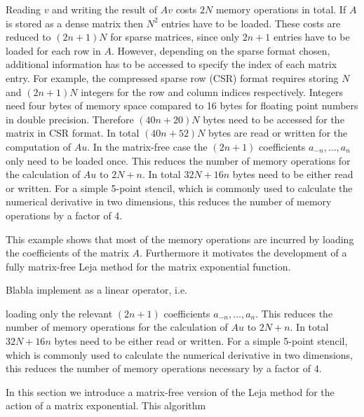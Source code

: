 \documentclass{scrartcl}
\begin{document}

Reading $v$ and writing the result of $Av$ costs $2N$ memory operations in total. If $A$ is stored as a dense matrix then $N^2$ entries have to be loaded. These costs are reduced to $(2n+1)N$ for sparse matrices, since only $2n+1$ entries have to be loaded for each row in $A$. However, depending on the sparse format chosen, additional information has to be accessed to specify the index of each matrix entry. For example, the compressed sparse row (CSR) format requires storing $N$ and $(2n+1)N$ integers for the row and column indices respectively. Integers need four bytes of memory space compared to 16 bytes for floating point numbers in double precision. Therefore $(40n + 20)N$ bytes need to be accessed for the matrix in CSR format. In total $(40n + 52)N$ bytes are read or written for the computation of $Au$.
In the matrix-free case the $(2n+1)$ coefficients $a_{-n}, \dots, a_{n}$ only need to be loaded once. This reduces the number of memory operations for the calculation of $Au$ to $2N + n$. In total $32N + 16n$ bytes need to be either read or written. For a simple 5-point stencil, which is commonly used to calculate the numerical derivative in two dimensions, this reduces the number of memory operations by a factor of 4.

This example shows that most of the memory operations are incurred by loading the coefficients of the matrix $A$. Furthermore it motivates the development of a fully matrix-free Leja method for the matrix exponential function. 

Blabla implement as a linear operator, i.e.

loading only the relevant $(2n+1)$ coefficients $a_{-n}, \dots, a_{n}$. This reduces the number of memory operations for the calculation of $Au$ to $2N + n$. In total $32N + 16n$ bytes need to be either read or written. For a simple 5-point stencil, which is commonly used to calculate the numerical derivative in two dimensions, this reduces the number of memory operations necessary by a factor of 4.

	
	In this section we introduce a matrix-free version of the Leja method for the action of a matrix exponential. This algorithm 
	
\end{document}
